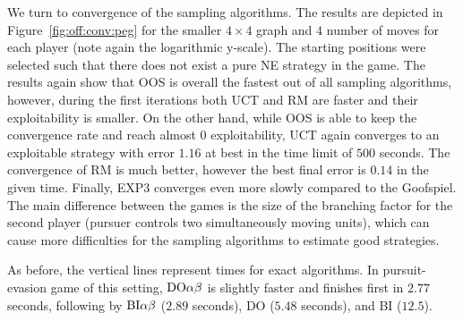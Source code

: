 We turn to convergence of the sampling algorithms.
The results are depicted in Figure~\ref{fig:off:conv:peg} for the smaller $4\times4$ graph and $4$ number of moves for each player (note again the logarithmic y-scale).
The starting positions were selected such that there does not exist a pure NE strategy in the game.
The results again show that OOS is overall the fastest out of all sampling algorithms, however, during the first iterations both UCT and RM are faster and their exploitability is smaller. 
On the other hand, while OOS is able to keep the convergence rate and reach almost $0$ exploitability, UCT again converges to an exploitable strategy with error $1.16$ at best in the time limit of $500$ seconds.
The convergence of RM is much better, however the best final error is $0.14$ in the given time.
Finally, EXP3 converges even more slowly compared to the Goofspiel.
The main difference between the games is the size of the branching factor for the second player (pursuer controls two simultaneously moving units), which can cause more difficulties for the sampling algorithms to estimate good strategies.

As before, the vertical lines represent times for exact algorithms.
In pursuit-evasion game of this setting, $\textrm{DO}\alpha\beta$ is slightly faster and finishes first in $2.77$ seconds, following by $\textrm{BI}\alpha\beta$ ($2.89$ seconds), \textsc{DO} ($5.48$ seconds), and \textsc{BI} ($12.5$).

